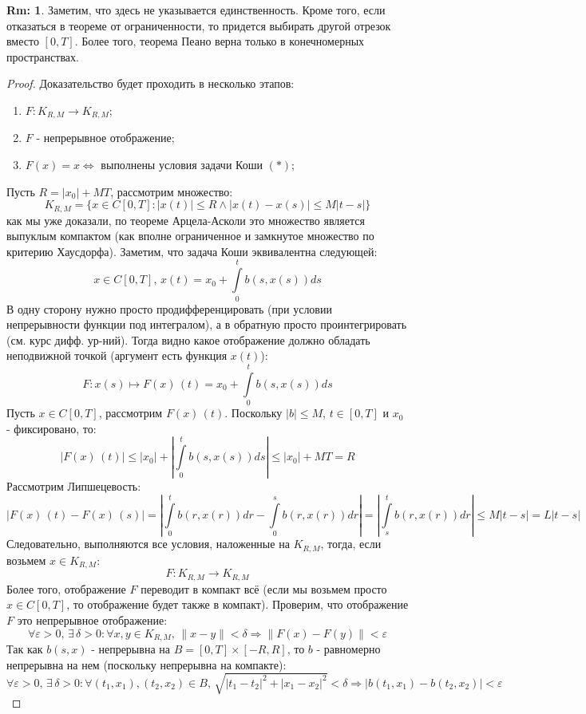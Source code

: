 \documentclass[12pt]{article}
\newcommand{\VE}{\varepsilon}
\theoremstyle{definition}
\newtheorem{rem}{Rm:}
\newcommand{\ddint}[2]{\displaystyle\int\limits_{#1}^{#2}}
\begin{document}
\begin{rem}
	Заметим, что здесь не указывается единственность. Кроме того, если отказаться в теореме от ограниченности, то придется выбирать другой отрезок вместо $[0,T]$. Более того, теорема Пеано верна только в конечномерных пространствах.
\end{rem}
\begin{proof}
	Доказательство будет проходить в несколько этапов:
	\begin{enumerate}[label ={(\arabic*)}]
		\item $F \colon K_{R,M} \to K_{R,M}$;
		\item $F$ - непрерывное отображение;
		\item $F(x) = x \Leftrightarrow$ выполнены условия задачи Коши $(*)$;
	\end{enumerate}
	Пусть $R = |x_0| + MT$, рассмотрим множество:
	$$
		K_{R,M} = \{x \in C[0,T] \colon |x(t)| \leq R \wedge |x(t) - x(s)| \leq M|t-s|\}
	$$
	как мы уже доказали, по теореме Арцела-Асколи это множество является выпуклым компактом (как вполне ограниченное и замкнутое множество по критерию Хаусдорфа). Заметим, что задача Коши эквивалентна следующей:
	$$
		x \in C[0,T], \, x(t) = x_0 + \ddint{0}{t}b(s,x(s))ds 
	$$
	В одну сторону нужно просто продифференцировать (при условии непрерывности функции под интегралом), а в обратную просто проинтегрировать (см. курс дифф. ур-ний). Тогда видно какое отображение должно обладать неподвижной точкой (аргумент есть функция $x(t)$):
	$$
		F\colon x(s)\mapsto F(x)\,(t) = x_0 + \ddint{0}{t}b(s,x(s))ds   
	$$
	Пусть $x \in C[0,T]$, рассмотрим $F(x)\,(t)$. Поскольку $|b|\leq M$, $t \in [0,T]$ и $x_0$ - фиксировано, то:
	$$
		|F(x)\,(t)| \leq |x_0| + \left|\ddint{0}{t}b(s,x(s))ds\right| \leq|x_0| + MT = R
	$$
	Рассмотрим Липшецевость:
	$$
		|F(x)\,(t) - F(x)\,(s)| = \left| \ddint{0}{t}b(r,x(r))dr - \ddint{0}{s}b(r,x(r))dr\right| = \left|\ddint{s}{t}b(r,x(r))dr \right| \leq M|t - s| = L |t - s|
	$$
	Следовательно, выполняются все условия, наложенные на $K_{R,M}$, тогда, если возьмем $x \in K_{R,M}$:
	$$
		F \colon K_{R,M} \to K_{R,M}
	$$
	Более того, отображение $F$ переводит в компакт всё (если мы возьмем просто $x \in C[0,T]$, то отображение будет также в компакт). Проверим, что отображение $F$ это непрерывное отображение: 
	$$
		\forall \VE > 0, \, \exists \, \delta > 0 \colon \forall x,y \in K_{R,M}, \, \|x-y\|<\delta \Rightarrow \|F(x) - F(y)\| < \VE	
	$$
	Так как $b(s,x)$ - непрерывна на $B = [0,T]\times[-R,R]$, то $b$ - равномерно непрерывна на нем (поскольку непрерывна на компакте):
	$$
		\forall \VE > 0, \, \exists \, \delta > 0 \colon \forall (t_1,x_1), (t_2, x_2) \in B, \, \sqrt{|t_1 - t_2|^2 + |x_1 - x_2|^2} < \delta \Rightarrow |b(t_1,x_1) - b(t_2, x_2)| < \VE
$$
\end{proof}
\end{document}
